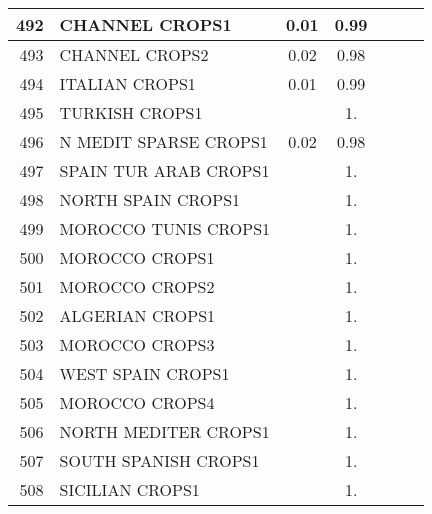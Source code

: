 {{\begin{tabular}{||r|l||c|c|c|c|c||}
 \hline
         492  & CHANNEL CROPS1                                               &  0.01 &  0.99 &       &       \\
 \hline
         493  & CHANNEL CROPS2                                               &  0.02 &  0.98 &       &       \\
 \hline
         494  & ITALIAN CROPS1                                               &  0.01 &  0.99 &       &       \\
 \hline
         495  & TURKISH CROPS1                                               &       &  1.   &       &       \\
 \hline
         496  & N MEDIT SPARSE CROPS1                                        &  0.02 &  0.98 &       &       \\
 \hline
         497  & SPAIN TUR ARAB CROPS1                                        &       &  1.   &       &       \\
 \hline
         498  & NORTH SPAIN CROPS1                                           &       &  1.   &       &       \\
 \hline
         499  & MOROCCO TUNIS CROPS1                                         &       &  1.   &       &       \\
 \hline
         500  & MOROCCO CROPS1                                               &       &  1.   &       &       \\
 \hline
         501  & MOROCCO CROPS2                                               &       &  1.   &       &       \\
 \hline
         502  & ALGERIAN CROPS1                                              &       &  1.   &       &       \\
 \hline
         503  & MOROCCO CROPS3                                               &       &  1.   &       &       \\
 \hline
         504  & WEST SPAIN CROPS1                                            &       &  1.   &       &       \\
 \hline
         505  & MOROCCO CROPS4                                               &       &  1.   &       &       \\
 \hline
         506  & NORTH MEDITER CROPS1                                         &       &  1.   &       &       \\
 \hline
         507  & SOUTH SPANISH CROPS1                                         &       &  1.   &       &       \\
 \hline
         508  & SICILIAN CROPS1                                              &       &  1.   &       &       \\

\end{tabular}}}
